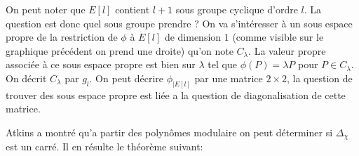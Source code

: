 \documentclass[12pt]{article}
\begin{document}
On peut noter que $E[l]$ contient $l+1$ sous groupe cyclique d'ordre $l$.
La question est donc quel sous groupe prendre ? On va s’intéresser à un sous espace propre de la restriction de $\phi$ à $E[l]$ de dimension $1$ (comme visible sur le graphique précédent on prend une droite) qu'on note $C_{\lambda}$. La valeur propre associée à ce sous espace propre est bien sur $\lambda$ tel que $\phi(P) = \lambda P$ pour $P \in C_{\lambda}$. On décrit $C_{\lambda}$ par $g_l$.
\newline
On peut décrire $\phi_{|E[l]}$ par une matrice $2\times2$, la question de trouver des sous espace propre est liée a la question de diagonalisation de cette matrice.

Atkins a montré qu'a partir des polynômes modulaire on peut déterminer si $\Delta_{\chi}$ est un carré. Il en résulte le théorème suivant:
\end{document}
